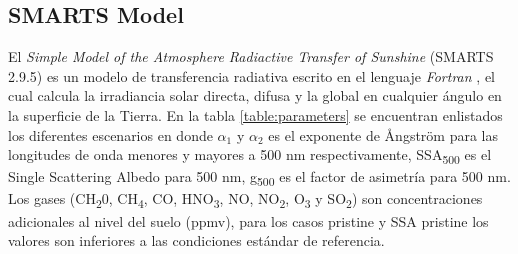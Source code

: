 \subsection{SMARTS Model}
El \textit{Simple Model of the Atmosphere Radiactive Transfer of Sunshine} (SMARTS 2.9.5) es un modelo de transferencia radiativa escrito en el lenguaje \textit{Fortran} \cite{Gueymard1995}, el cual calcula la irradiancia solar directa, difusa y la global en cualquier ángulo en la superficie de la Tierra. En la tabla \ref{table:parameters} se encuentran enlistados los diferentes escenarios en donde $\alpha_1$ y $\alpha_2$ es el exponente de \AA ngstr\"om para las longitudes de onda menores y mayores a 500 nm respectivamente, SSA\textsubscript{500} es el Single Scattering Albedo para 500 nm, g\textsubscript{500} es el factor de asimetría para 500 nm. Los gases (CH\textsubscript{2}0, CH\textsubscript{4}, CO, HNO\textsubscript{3}, NO, NO\textsubscript{2}, O\textsubscript{3} y SO\textsubscript{2}) son concentraciones adicionales al nivel del suelo (ppmv), para los casos pristine y SSA pristine los valores son inferiores a las condiciones estándar de referencia. \cite{Gueymard1995}
